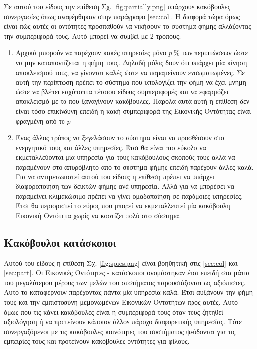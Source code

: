 Σε αυτού του είδους την επίθεση Σχ. \ref{fig:partially.png} υπάρχουν κακόβουλες συνεργασίες όπως αναφέρθηκαν στην παράγραφο \ref{sec:col}. Η διαφορά τώρα όμως είναι πώς αυτές οι οντότητες προσπαθούν να νικήσουν το σύστημα φήμης αλλάζοντας την συμπεριφορά τους. Αυτό μπορεί να συμβεί με 2 τρόπους: 
\begin{enumerate}

\item Αρχικά μπορούν να παρέχουν κακές υπηρεσίες μόνο $ p \ \%  $ των περιπτώσεων ώστε να μην καταποντίζεται η φήμη τους. Δηλαδή μόλις δουν ότι υπάρχει μία κίνηση αποκλεισμού τους, να γίνονται καλές ώστε να παραμείνουν ενσωματωμένες. Σε αυτή την περίπτωση πρέπει το σύστημα που υπολογίζει την φήμη να έχει μνήμη ώστε να βλέπει καχύποπτα τέτοιου είδους συμπεριφορές και να εφαρμόζει αποκλεισμό με το που ξαναγίνουν κακόβουλες. Παρόλα αυτά αυτή η επίθεση δεν είναι τόσο επικίνδυνη επειδή η κακή συμπεριφορά της Εικονικής Οντότητας είναι φραγμένη από το $p$

\item Ένας άλλος τρόπος να ξεγελάσουν το σύστημα είναι να προσθέσουν στο ενεργητικό τους και άλλες υπηρεσίες. Έτσι θα είναι πιο εύκολο να εκμεταλλεύονται μία υπηρεσία για τους κακόβουλους σκοπούς τους αλλά να παραμένουν στο απυρόβλητο από το σύστημα φήμης επειδή παρέχουν άλλες καλά. Για να αντιμετωπιστεί αυτού του είδους η επίθεση πρέπει να υπάρχει διαφοροποίηση των δεικτών φήμης ανά υπηρεσία. Αλλά για να μπορέσει να παραμείνει κλιμακώσιμο πρέπει να γίνει ομαδοποίηση σε παρόμοιες υπηρεσίες. Έτσι θα περιοριστεί το εύρος που μπορεί να εκμεταλλευτεί μία κακόβουλη Εικονική Οντότητα χωρίς να κοστίζει πολύ στο σύστημα.
\end{enumerate}

\newpage
\subsection{Κακόβουλοι κατάσκοποι}\label{sec:spies}

Αυτού του είδους η επίθεση  Σχ. \ref{fig:spies.png} είναι βοηθητική στις \ref{sec:col} και \ref{sec:part}. Οι Εικονικές Οντότητες - κατάσκοποι ονομάστηκαν έτσι επειδή στα μάτια του μεγαλύτερου μέρους των μελών του συστήματος παρουσιάζονται ως αξιόπιστες. Αυτό το καταφέρνουν παρέχοντας πάντα μία υπηρεσία καλά. Έτσι αυξάνουν την φήμη τους και την εμπιστοσύνη μεμονωμένων Εικονικών Οντοτήτων προς αυτές. Αυτό όμως που τις κάνει κακόβουλες είναι η συμπεριφορά τους όταν τους ζητηθεί αξιολόγηση ή να προτείνουν κάποιον άλλον πάροχο διαφορετικής υπηρεσίας. Τότε συνεργαζόμενοι με τις κακόβουλες κοινότητες του συστήματος ψεύδονται για τις εμπειρίες τους και προτείνουν κακόβουλες οντότητες για φίλους.


